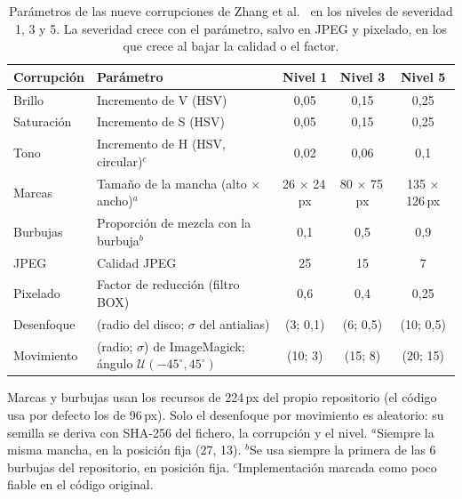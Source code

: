 \begin{table}
\centering
\footnotesize
\setlength{\tabcolsep}{4pt}
\caption{Parámetros de las nueve corrupciones de Zhang et al.~\cite{zhang2022corruptions} en los niveles de severidad 1, 3 y 5. La severidad crece con el parámetro, salvo en JPEG y pixelado, en los que crece al bajar la calidad o el factor.}
\label{tab:corrupciones}
\begin{tabularx}{\textwidth}{@{}l>{\raggedright\arraybackslash}Xccc@{}}
\toprule
Corrupción & Parámetro & Nivel 1 & Nivel 3 & Nivel 5 \\
\midrule
Brillo & Incremento de V (HSV) & 0{,}05 & 0{,}15 & 0{,}25 \\
Saturación & Incremento de S (HSV) & 0{,}05 & 0{,}15 & 0{,}25 \\
Tono & Incremento de H (HSV, circular)$^{c}$ & 0{,}02 & 0{,}06 & 0{,}1 \\
Marcas & Tamaño de la mancha (alto $\times$ ancho)$^{a}$ & 26 $\times$ 24\,px & 80 $\times$ 75\,px & 135 $\times$ 126\,px \\
Burbujas & Proporción de mezcla con la burbuja$^{b}$ & 0{,}1 & 0{,}5 & 0{,}9 \\
JPEG & Calidad JPEG & 25 & 15 & 7 \\
Pixelado & Factor de reducción (filtro BOX) & 0{,}6 & 0{,}4 & 0{,}25 \\
Desenfoque & (radio del disco; $\sigma$ del antialias) & (3; 0{,}1) & (6; 0{,}5) & (10; 0{,}5) \\
Movimiento & (radio; $\sigma$) de ImageMagick; ángulo $\mathcal{U}(-45^\circ, 45^\circ)$ & (10; 3) & (15; 8) & (20; 15) \\
\bottomrule
\end{tabularx}

\smallskip
\parbox{\linewidth}{\scriptsize Marcas y burbujas usan los recursos de 224\,px del propio repositorio (el código usa por defecto los de 96\,px). Solo el desenfoque por movimiento es aleatorio: su semilla se deriva con SHA-256 del fichero, la corrupción y el nivel. $^{a}$Siempre la misma mancha, en la posición fija (27, 13). $^{b}$Se usa siempre la primera de las 6 burbujas del repositorio, en posición fija. $^{c}$Implementación marcada como poco fiable en el código original.}
\end{table}
